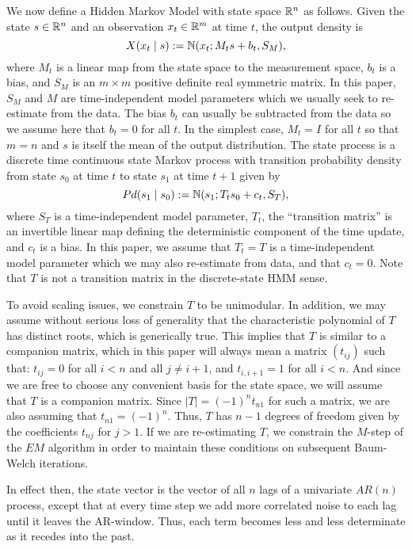 \documentclass[12pt,leqno]{article}
\begin{document}
We now define a Hidden Markov Model with state space ${\mathbb R}^n$ as follows.  Given the state $s\in{\mathbb R}^n$ and an observation $x_t\in{\mathbb R}^m$ at time $t$, the output density is
$$
X(x_t\mid s) := {\mathbb N}(x_t;M_ts + b_t,S_M),
$$
where $M_t$ is a linear map from the state space to the
measurement space, $b_t$ is a bias, and $S_M$ is an $m\times{m}$ positive definite real symmetric matrix.  In this paper, $S_M$ and $M$ are time-independent model parameters which we usually seek to re-estimate from the data.  The bias $b_t$ can
usually be 
subtracted from the data so we assume here that $b_t = 0$ for all $t$. 
In the simplest case, $M_t = I$ for all $t$ so that $m = n$ and $s$ is itself the mean of the output distribution.  
The state process is a discrete time continuous state Markov process with transition probability density
from state $s_0$ at time $t$ to state $s_1$ at time $t+1$ given by
$$
Pd(s_1\mid s_0) :=  {\mathbb N}(s_1;T_ts_0+c_t,S_T),
$$
where $S_T$ is a time-independent model parameter, $T_t$, the ``transition matrix'' is an invertible linear map  
defining the deterministic component of the time update, and $c_t$ is a bias.  In this paper, we assume that
$T_t = T$ is a time-independent model parameter which we may
also re-estimate from data, and that $c_t = 0$.  Note that $T$ is not a transition matrix in the
discrete-state HMM sense.

To avoid scaling issues, we constrain $T$ to be unimodular.  In addition,  we may assume without serious loss of generality
that the characteristic polynomial of $T$ has distinct roots, which is generically true.  This implies that $T$
is similar to a companion matrix, which in this paper will always mean a matrix $(t_{ij})$ such that:
$t_{ij} = 0$ for all $i < n$ and all $j \neq i+1$, and $t_{i,i+1} = 1$ for all $i < n$.  And since
we are free to choose any convenient basis for the state space, we will assume that $T$ is a companion matrix.
Since $|T| = (-1)^nt_{n1}$ for such a matrix, we are also assuming that $t_{n1} = (-1)^n$.  Thus, $T$ has $n-1$
degrees of freedom given by the coefficients $t_{nj}$ for $j > 1$.  If we are re-estimating $T$, we constrain the $M$-step
of the $EM$ algorithm in order to maintain these conditions on subsequent Baum-Welch iterations.

In effect then, the state vector is the vector of all $n$ lags of a univariate $AR(n)$ process, except that
at every time step we add more correlated noise to each lag until it leaves the AR-window. Thus,
each term becomes less and less determinate as it recedes into the past.
\end{document}
